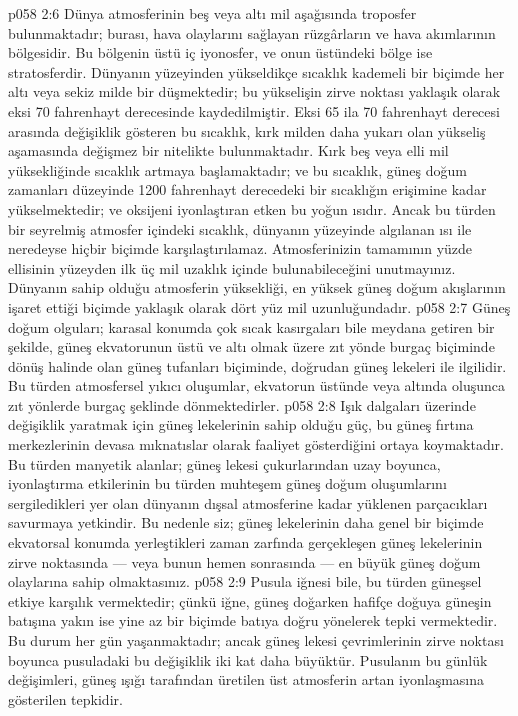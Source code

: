 \vs p058 2:6 Dünya atmosferinin beş veya altı mil aşağısında troposfer bulunmaktadır; burası, hava olaylarını sağlayan rüzgârların ve hava akımlarının bölgesidir. Bu bölgenin üstü iç iyonosfer, ve onun üstündeki bölge ise stratosferdir. Dünyanın yüzeyinden yükseldikçe sıcaklık kademeli bir biçimde her altı veya sekiz milde bir düşmektedir; bu yükselişin zirve noktası yaklaşık olarak eksi 70 fahrenhayt derecesinde kaydedilmiştir. Eksi 65 ila 70 fahrenhayt derecesi arasında değişiklik gösteren bu sıcaklık, kırk milden daha yukarı olan yükseliş aşamasında değişmez bir nitelikte bulunmaktadır. Kırk beş veya elli mil yüksekliğinde sıcaklık artmaya başlamaktadır; ve bu sıcaklık, güneş doğum zamanları düzeyinde 1200 fahrenhayt derecedeki bir sıcaklığın erişimine kadar yükselmektedir; ve oksijeni iyonlaştıran etken bu yoğun ısıdır. Ancak bu türden bir seyrelmiş atmosfer içindeki sıcaklık, dünyanın yüzeyinde algılanan ısı ile neredeyse hiçbir biçimde karşılaştırılamaz. Atmosferinizin tamamının yüzde ellisinin yüzeyden ilk üç mil uzaklık içinde bulunabileceğini unutmayınız. Dünyanın sahip olduğu atmosferin yüksekliği, en yüksek güneş doğum akışlarının işaret ettiği biçimde yaklaşık olarak dört yüz mil uzunluğundadır.
\vs p058 2:7 Güneş doğum olguları; karasal konumda çok sıcak kasırgaları bile meydana getiren bir şekilde, güneş ekvatorunun üstü ve altı olmak üzere zıt yönde burgaç biçiminde dönüş halinde olan güneş tufanları biçiminde, doğrudan güneş lekeleri ile ilgilidir. Bu türden atmosfersel yıkıcı oluşumlar, ekvatorun üstünde veya altında oluşunca zıt yönlerde burgaç şeklinde dönmektedirler.
\vs p058 2:8 Işık dalgaları üzerinde değişiklik yaratmak için güneş lekelerinin sahip olduğu güç, bu güneş fırtına merkezlerinin devasa mıknatıslar olarak faaliyet gösterdiğini ortaya koymaktadır. Bu türden manyetik alanlar; güneş lekesi çukurlarından uzay boyunca, iyonlaştırma etkilerinin bu türden muhteşem güneş doğum oluşumlarını sergiledikleri yer olan dünyanın dışsal atmosferine kadar yüklenen parçacıkları savurmaya yetkindir. Bu nedenle siz; güneş lekelerinin daha genel bir biçimde ekvatorsal konumda yerleştikleri zaman zarfında gerçekleşen güneş lekelerinin zirve noktasında --- veya bunun hemen sonrasında --- en büyük güneş doğum olaylarına sahip olmaktasınız.
\vs p058 2:9 Pusula iğnesi bile, bu türden güneşsel etkiye karşılık vermektedir; çünkü iğne, güneş doğarken hafifçe doğuya güneşin batışına yakın ise yine az bir biçimde batıya doğru yönelerek tepki vermektedir. Bu durum her gün yaşanmaktadır; ancak güneş lekesi çevrimlerinin zirve noktası boyunca pusuladaki bu değişiklik iki kat daha büyüktür. Pusulanın bu günlük değişimleri, güneş ışığı tarafından üretilen üst atmosferin artan iyonlaşmasına gösterilen tepkidir.
